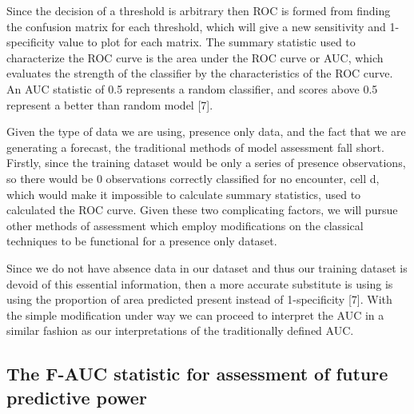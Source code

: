 \noindent Since the decision of a threshold is arbitrary then ROC is formed from finding the confusion matrix for each threshold, which will give a new sensitivity and 1-specificity value to plot for each matrix. The summary statistic used to characterize the ROC curve is the area under the ROC curve or AUC, which evaluates the strength of the classifier by the characteristics of the ROC curve. An AUC statistic of 0.5 represents a random classifier, and scores above 0.5 represent a better than random model [7].    \newline

\noindent Given the type of data we are using, presence only data, and the fact that we are generating a forecast, the traditional methods of model assessment fall short. Firstly, since the training dataset would be only a series of presence observations, so there would be 0 observations correctly classified for no encounter, cell d,  which would make it impossible to calculate summary statistics, used to calculated the ROC curve. Given these two complicating factors, we will pursue other methods of assessment which employ modifications on the classical techniques to be functional for a presence only dataset.  \newline

\noindent Since we do not have absence data in our dataset and thus our training dataset is devoid of this essential information, then a more accurate substitute is using is using the proportion of area predicted present instead of 1-specificity [7]. With the simple modification under way we can proceed to interpret the AUC in a similar fashion as our interpretations of the traditionally defined AUC.  \newline


\subsection{The F-AUC statistic for assessment of future predictive power }

